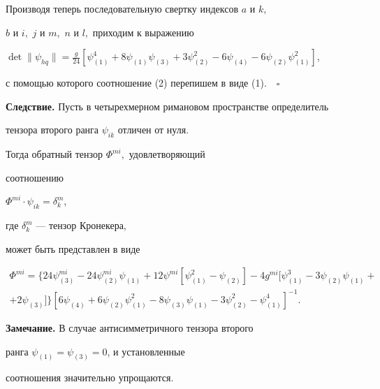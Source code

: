 Производя теперь последовательную свертку индексов $a$ и $k,$


$b$ и $i,$ $j$ и $m,$ $n$ и $l,$ приходим к выражению


$\det\|\psi_{hq}\|=\frac{g}{24}[\psi_{(1)}^4+8\psi_{(1)}\psi_{(3)}


+3\psi_{(2)}^2-6\psi_{(4)}-6\psi_{(2)}\psi_{(1)}^2]$,


с помощью которого соотношение (2) перепишем в виде (1).$\quad\square$


\smallskip





{\bf Следствие.} Пусть в четырехмерном римановом пространстве определитель


тензора второго ранга $\psi_{ik}$ отличен от нуля.


Тогда обратный тензор $\Phi^{mi},$ удовлетворяющий


соотношению


$\Phi^{mi}\cdot \psi_{ik} =\delta^m_k$,


где $\delta^m_k$ --- тензор Кронекера,


может быть представлен в виде


\begin{multline*}


\Phi^{mi} =\{24\psi^{mi}_{(3)}-24\psi^{mi}_{(2)}\psi_{(1)}


+12\psi^{mi}[\psi^2_{(1)}-\psi_{(2)}]-4g^{mi}


[\psi^3_{(1)}-3\psi_{(2)}\psi_{(1)}+ \\


%


+2\psi_{(3)}]


\} [6\psi_{(4)}+6\psi_{(2)}\psi^2_{(1)}-


8\psi_{(3)}\psi_{(1)}-3\psi^2_{(2)}-\psi^4_{(1)}]^{-1}.


\end{multline*}





{\bf Замечание.} В случае антисимметричного тензора второго


ранга $\psi_{(1)}=\psi_{(3)}=0$, и установленные


соотношения значительно упрощаются.





